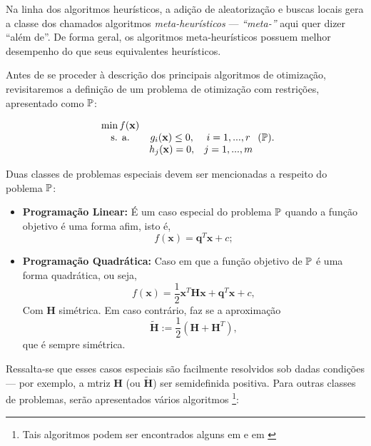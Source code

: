 Na linha dos algoritmos heur\'{i}sticos, a adi\c{c}\~{a}o de aleatoriza\c{c}\~{a}o e buscas locais gera a classe dos chamados algoritmos \textit{meta-heur\'{i}sticos} --- \textit{``meta-''} aqui quer dizer ``al\'{e}m de''. De forma geral, os algoritmos meta-heur\'{i}sticos possuem melhor desempenho do que seus equivalentes heur\'{i}sticos.

Antes de se proceder \`{a} descri\c{c}\~{a}o dos principais algoritmos de otimiza\c{c}\~{a}o, revisitaremos a defini\c{c}\~{a}o de um problema de otimiza\c{c}\~{a}o com restri\c{c}\~{o}es, apresentado como $\mathbb{P}$:

\begin{equation}
\label{compProb2}
\begin{array}{ccc}
\min f(\mathbf{x}) & &\\
\text{s. a.} & g_i (\mathbf{x}) \le 0, & i = 1,...,r\\ 
 & h_j (\mathbf{x}) = 0, & j = 1,...,m
\end{array} (\mathbb{P}).
\end{equation}

Duas classes de problemas especiais devem ser mencionadas a respeito do poblema $\mathbb{P}$:

\begin{itemize}
\item \textbf{Programa\c{c}\~{a}o Linear:} \'{E} um caso especial do problema $\mathbb{P}$ quando a fun\c{c}\~{a}o objetivo \'{e} uma forma afim, isto \'{e},
\begin{equation*}
f(\mathbf{x}) = \mathbf{q}^T \mathbf{x} + c;
\end{equation*}
\item \textbf{Programa\c{c}\~{a}o Quadr\'{a}tica:} Caso em que a fun\c{c}\~{a}o objetivo de $\mathbb{P}$ \'{e} uma forma quadr\'{a}tica, ou seja,
\begin{equation*}
f(\mathbf{x}) = \frac{1}{2}\mathbf{x}^T \mathbf{Hx} + \mathbf{q}^T \mathbf{x} + c,
\end{equation*}
Com $\mathbf{H}$ sim\'{e}trica. Em caso contr\'{a}rio, faz se a aproxima\c{c}\~{a}o
\begin{equation*}
\tilde{\mathbf{H}} := \frac{1}{2} (\mathbf{H} + \mathbf{H}^T),
\end{equation*}
que \'{e} sempre sim\'{e}trica.
\end{itemize}

Ressalta-se que esses casos especiais s\~{a}o facilmente resolvidos sob dadas condi\c{c}\~{o}es --- por exemplo, a mtriz $\mathbf{H}$ (ou $\tilde{\mathbf{H}}$) ser semidefinida positiva. Para outras classes de problemas, ser\~{a}o apresentados v\'{a}rios algoritmos \footnote{Tais algoritmos podem ser encontrados alguns em \cite{guller} e em \cite{yang}}:

